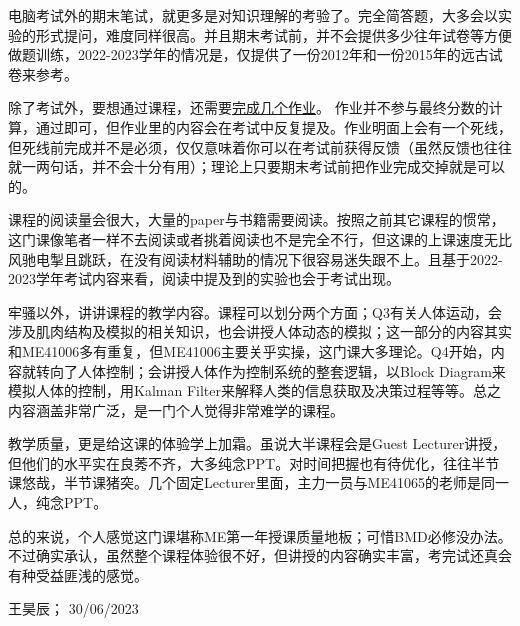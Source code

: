 电脑考试外的期末笔试，就更多是对知识理解的考验了。完全简答题，大多会以实验的形式提问，难度同样很高。并且期末考试前，并不会提供多少往年试卷等方便做题训练，2022-2023学年的情况是，仅提供了一份2012年和一份2015年的远古试卷来参考。

除了考试外，要想通过课程，还需要\href{https://drive.google.com/file/d/1KxbD13PnAkygeto3pSj9S3xFacHufyzy/view?usp=sharing}{\uline{完成几个作业}}。 作业并不参与最终分数的计算，通过即可，但作业里的内容会在考试中反复提及。作业明面上会有一个死线，但死线前完成并不是必须，仅仅意味着你可以在考试前获得反馈（虽然反馈也往往就一两句话，并不会十分有用）；理论上只要期末考试前把作业完成交掉就是可以的。

课程的阅读量会很大，大量的paper与书籍需要阅读。按照之前其它课程的惯常，这门课像笔者一样不去阅读或者挑着阅读也不是完全不行，但这课的上课速度无比风驰电掣且跳跃，在没有阅读材料辅助的情况下很容易迷失跟不上。且基于2022-2023学年考试内容来看，阅读中提及到的实验也会于考试出现。

牢骚以外，讲讲课程的教学内容。课程可以划分两个方面；Q3有关人体运动，会涉及肌肉结构及模拟的相关知识，也会讲授人体动态的模拟；这一部分的内容其实和ME41006多有重复，但ME41006主要关乎实操，这门课大多理论。Q4开始，内容就转向了人体控制；会讲授人体作为控制系统的整套逻辑，以Block Diagram来模拟人体的控制，用Kalman Filter来解释人类的信息获取及决策过程等等。总之内容涵盖非常广泛，是一门个人觉得非常难学的课程。

教学质量，更是给这课的体验学上加霜。虽说大半课程会是Guest Lecturer讲授，但他们的水平实在良莠不齐，大多纯念PPT。对时间把握也有待优化，往往半节课悠哉，半节课猪突。几个固定Lecturer里面，主力一员与ME41065的老师是同一人，纯念PPT。

总的来说，个人感觉这门课堪称ME第一年授课质量地板；可惜BMD必修没办法。不过确实承认，虽然整个课程体验很不好，但讲授的内容确实丰富，考完试还真会有种受益匪浅的感觉。
\begin{flushright}
王昊辰； 30/06/2023
\end{flushright}

